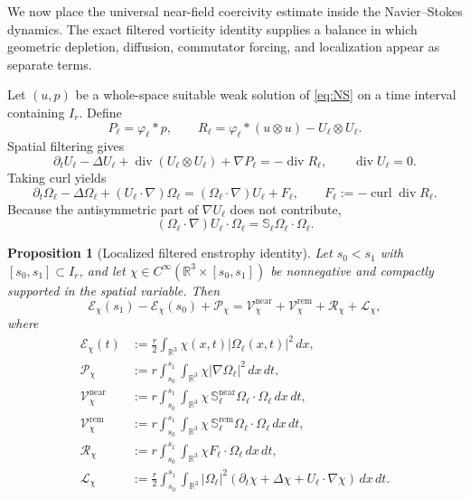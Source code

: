 \documentclass[11pt]{article}
\numberwithin{equation}{section}
\theoremstyle{plain}
\newtheorem{proposition}[theorem]{Proposition}
\theoremstyle{definition}
\theoremstyle{remark}
\DeclareMathOperator{\curl}{curl}
\DeclareMathOperator{\diver}{div}
\newcommand{\R}{\mathbb R}
\begin{document}
We now place the universal near-field coercivity estimate inside the Navier--Stokes dynamics.  The exact filtered vorticity identity supplies a balance in which geometric depletion, diffusion, commutator forcing, and localization appear as separate terms.

Let $(u,p)$ be a whole-space suitable weak solution of \eqref{eq:NS} on a time interval containing $I_r$. Define
\begin{equation}\label{eq:filtered-pressure-stress}
P_\ell=\varphi_\ell*p,
\qquad
R_\ell=\varphi_\ell*(u\otimes u)-U_\ell\otimes U_\ell.
\end{equation}
Spatial filtering gives
\begin{equation}\label{eq:filtered-momentum}
\partial_tU_\ell-\Delta U_\ell
+\diver(U_\ell\otimes U_\ell)+\nabla P_\ell
=-\diver R_\ell,
\qquad
\diver U_\ell=0.
\end{equation}
Taking curl yields
\begin{equation}\label{eq:filtered-vorticity}
\partial_t\Omega_\ell-\Delta\Omega_\ell
+(U_\ell\cdot\nabla)\Omega_\ell
=(\Omega_\ell\cdot\nabla)U_\ell+F_\ell,
\qquad
F_\ell:=-\curl\diver R_\ell.
\end{equation}
Because the antisymmetric part of $\nabla U_\ell$ does not contribute,
\begin{equation}\label{eq:stretching-strain}
(\Omega_\ell\cdot\nabla)U_\ell\cdot\Omega_\ell
=\mathbb S_\ell\Omega_\ell\cdot\Omega_\ell.
\end{equation}

\begin{proposition}[Localized filtered enstrophy identity]\label{prop:enstrophy-identity}
Let $s_0<s_1$ with $[s_0,s_1]\subset I_r$, and let
$\chi\in C^\infty(\R^3\times[s_0,s_1])$ be nonnegative and compactly supported in the spatial variable. Then
\begin{equation}\label{eq:enstrophy-identity}
\mathcal E_\chi(s_1)-\mathcal E_\chi(s_0)
+\mathcal P_\chi
=
\mathcal V_\chi^{\mathrm{near}}
+\mathcal V_\chi^{\mathrm{rem}}
+\mathcal R_\chi
+\mathcal L_\chi,
\end{equation}
where
\begin{align}
\mathcal E_\chi(t)
&:=\frac r2\int_{\R^3}\chi(x,t)|\Omega_\ell(x,t)|^2\,dx,
\label{eq:Echi}\\
\mathcal P_\chi
&:=r\int_{s_0}^{s_1}\int_{\R^3}\chi|\nabla\Omega_\ell|^2\,dx\,dt,
\label{eq:Pchi}\\
\mathcal V_\chi^{\mathrm{near}}
&:=r\int_{s_0}^{s_1}\int_{\R^3}
\chi\,\mathbb S_\ell^{\mathrm{near}}\Omega_\ell\cdot\Omega_\ell\,dx\,dt,
\label{eq:Vchi-near}\\
\mathcal V_\chi^{\mathrm{rem}}
&:=r\int_{s_0}^{s_1}\int_{\R^3}
\chi\,\mathbb S_\ell^{\mathrm{rem}}\Omega_\ell\cdot\Omega_\ell\,dx\,dt,
\label{eq:Vchi-rem}\\
\mathcal R_\chi
&:=r\int_{s_0}^{s_1}\int_{\R^3}\chi F_\ell\cdot\Omega_\ell\,dx\,dt,
\label{eq:Rchi}\\
\mathcal L_\chi
&:=\frac r2\int_{s_0}^{s_1}\int_{\R^3}
|\Omega_\ell|^2
(\partial_t\chi+\Delta\chi+U_\ell\cdot\nabla\chi)
\,dx\,dt.
\label{eq:Lchi}
\end{align}
\end{proposition}
\end{document}
